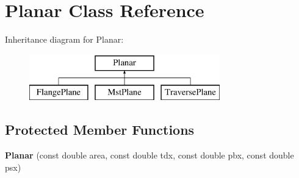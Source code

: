 \hypertarget{class_planar}{}\section{Planar Class Reference}
\label{class_planar}
Inheritance diagram for Planar\+:\begin{figure}[H]
\begin{center}
\leavevmode
\includegraphics[height=2.000000cm]{d2/ddc/class_planar}
\end{center}
\end{figure}
\subsection*{Protected Member Functions}
\begin{DoxyCompactItemize}
\item 
\mbox{\label{class_planar_ac15d774625cfccef75b1fa5742482f5a}} 
{\bfseries Planar} (const double area, const double tdx, const double pbx, const double psx)
\end{DoxyCompactItemize}
